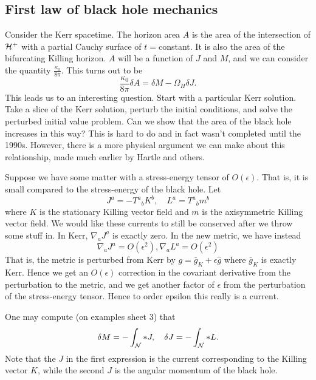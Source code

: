 \subsection*{First law of black hole mechanics}
Consider the Kerr spacetime. The horizon area $A$ is the area of the intersection of $\mathcal H^+$ with a partial Cauchy surface of $t={}$constant. It is also the area of the bifurcating Killing horizon. $A$ will be a function of $J$ and $M$, and we can consider the quantity $\frac{\kappa_0}{8\pi}$. This turns out to be
\begin{equation}
    \frac{\kappa_0}{8\pi}\delta A = \delta M -\Omega_H \delta J.
\end{equation}
This leads us to an interesting question. Start with a particular Kerr solution. Take a slice of the Kerr solution, perturb the initial conditions, and solve the perturbed initial value problem. Can we show that the area of the black hole increases in this way? This is hard to do and in fact wasn't completed until the 1990s.%
However, there is a more physical argument we can make about this relationship, made much earlier by Hartle and others.

Suppose we have some matter with a stress-energy tensor of $O(\epsilon)$. That is, it is small compared to the stress-energy of the black hole. Let
\begin{equation}
    J^a = -T^a{}_b K^b,\quad L^a = T^a{}_b m^b
\end{equation}
where $K$ is the stationary Killing vector field and $m$ is the axisymmetric Killing vector field. We would like these currents to still be conserved after we throw some stuff in. In Kerr, $\nabla_a J^a$ is exactly zero. In the new metric, we have instead
\begin{equation}
    \nabla_a J^a = O(\epsilon^2), \nabla_a L^a = O(\epsilon^2)
\end{equation}
That is, the metric is perturbed from Kerr by $g=\bar g_K +\epsilon \hat g$ where $\bar g_K$ is exactly Kerr. Hence we get an $O(\epsilon)$ correction in the covariant derivative from the perturbation to the metric, and we get another factor of $\epsilon$ from the perturbation of the stress-energy tensor. Hence to order epsilon this really is a current.

One may compute (on examples sheet 3) that
\begin{equation}
    \delta M =-\int_\mathcal N * J, \quad \delta J = -\int_\mathcal N * L.
\end{equation}
Note that the $J$ in the first expression is the current corresponding to the Killing vector $K$, while the second $J$ is the angular momentum of the black hole.

